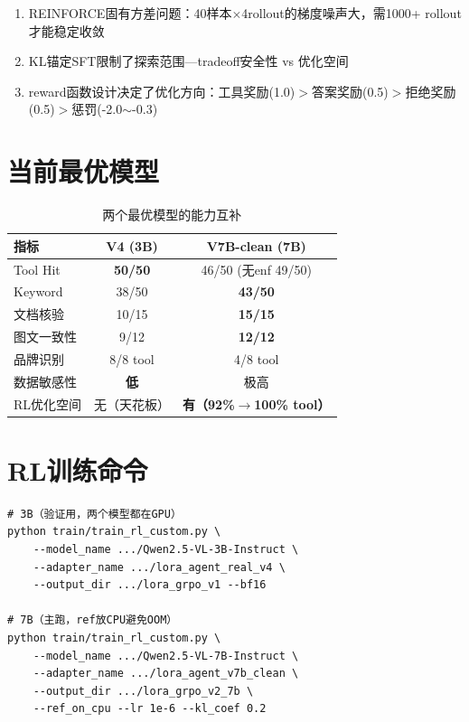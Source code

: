 \documentclass[fontset=none,11pt,a4paper]{ctexart}
\begin{document}
\begin{enumerate}[nosep]
    \item REINFORCE固有方差问题：40样本$\times$4rollout的梯度噪声大，需1000+ rollout才能稳定收敛
    \item KL锚定SFT限制了探索范围---tradeoff安全性 vs 优化空间
    \item reward函数设计决定了优化方向：工具奖励(1.0)$>$答案奖励(0.5)$>$拒绝奖励(0.5)$>$惩罚(-2.0$\sim$-0.3)
\end{enumerate}

\section{当前最优模型}

\begin{table}[htbp]
\centering
\begin{tabular}{lcc}
\toprule
指标 & V4 (3B) & V7B-clean (7B) \\
\midrule
Tool Hit & \textbf{50/50} & 46/50 (无enf 49/50) \\
Keyword & 38/50 & \textbf{43/50} \\
文档核验 & 10/15 & \textbf{15/15} \\
图文一致性 & 9/12 & \textbf{12/12} \\
品牌识别 & 8/8 tool & 4/8 tool \\
数据敏感性 & \textbf{低} & 极高 \\
RL优化空间 & 无（天花板） & \textbf{有（92\%$\to$100\% tool）} \\
\bottomrule
\end{tabular}
\caption{两个最优模型的能力互补}
\end{table}

\section{RL训练命令}

\begin{verbatim}
# 3B（验证用，两个模型都在GPU）
python train/train_rl_custom.py \
    --model_name .../Qwen2.5-VL-3B-Instruct \
    --adapter_name .../lora_agent_real_v4 \
    --output_dir .../lora_grpo_v1 --bf16

# 7B（主跑，ref放CPU避免OOM）
python train/train_rl_custom.py \
    --model_name .../Qwen2.5-VL-7B-Instruct \
    --adapter_name .../lora_agent_v7b_clean \
    --output_dir .../lora_grpo_v2_7b \
    --ref_on_cpu --lr 1e-6 --kl_coef 0.2
\end{verbatim}
\end{document}
